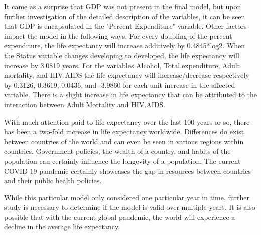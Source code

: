 It came as a surprise that GDP was not present in the final model, but upon further investigation of the detailed description of the variables, it can be seen that GDP is encapsulated in the "Percent Expenditure" variable. Other factors impact the model in the following ways. For every doubling of the percent expenditure, the life expectancy will increase additively by 0.4845*log2. When the Status variable changes developing to developed, the life expectancy will increase by 3.0819 years. For the variables Alcohol, Total.expenditure, Adult mortality, and HIV.AIDS the life expectancy will increase/decrease respectively by 0.3126, 0.3619, 0.0436, and -3.9860 for each unit increase in the affected variable. There is a slight increase in life expectancy that can be attributed to the interaction between Adult.Mortality and HIV.AIDS.

With much attention paid to life expectancy over the last 100 years or so, there has been a two-fold increase in life expectancy worldwide. Differences do exist between countries of the world and can even be seen in various regions within countries. Government policies, the wealth of a country, and habits of the population can certainly influence the longevity of a population. The current COVID-19 pandemic certainly showcases the gap in resources between countries and their public health policies. 

While this particular model only considered one particular year in time, further study is necessary to determine if the model is valid over multiple years. It is also possible that with the current global pandemic, the world will experience a decline in the average life expectancy.





